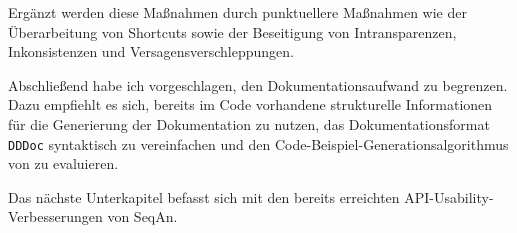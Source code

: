 Ergänzt werden diese Maßnahmen durch punktuellere Maßnahmen wie der Überarbeitung von Shortcuts sowie der Beseitigung von Intransparenzen, Inkonsistenzen und Versagensverschleppungen.

Abschließend habe ich vorgeschlagen, den Dokumentationsaufwand zu begrenzen. Dazu empfiehlt es sich, bereits im Code vorhandene strukturelle Informationen für die Generierung der Dokumentation zu nutzen, das Dokumentationsformat \texttt{DDDoc} syntaktisch zu vereinfachen und den Code-Beispiel-Generationsalgorithmus von \cite{Buse:2012vv} zu evaluieren.

\bigskip

Das nächste Unterkapitel befasst sich mit den bereits erreichten API-Usability-Verbesserungen von SeqAn.